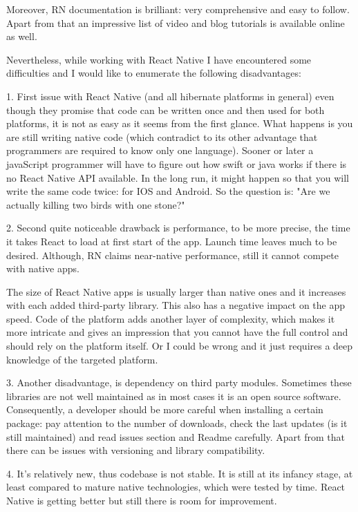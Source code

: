 Moreover, RN documentation is brilliant: very comprehensive and easy to follow.
Apart from that an impressive list of video and blog tutorials is available online as well.

Nevertheless, while working with React Native I have encountered some difficulties and I would like to enumerate the following disadvantages:

1. First issue with React Native (and all hibernate platforms in general) even though they promise that code can be written once and then used for both platforms, it is not as easy as it seems from the first glance. What happens is you are still writing native code (which contradict to its other advantage that programmers are required to know only one language). Sooner or later a javaScript programmer will have to figure out how swift or java works if there is no React Native API available. In the long run, it might happen so that you will write the same code twice: for IOS and Android. So the question is: "Are we actually killing two birds with one stone?"

2. Second quite noticeable drawback is performance, to be more precise, the time it takes React to load at first start of the app. Launch time leaves much to be desired.
Although, RN claims near-native performance, still it cannot compete with native apps.

The size of React Native apps is usually larger than native ones and it increases with each added third-party library. This also has a negative impact on the app speed.
Code of the platform adds another layer of complexity, which makes it more intricate and gives an impression that you cannot have the full control and should rely on the platform itself.
Or I could be wrong and it just requires a deep knowledge of the targeted platform.

3. Another disadvantage, is dependency on third party modules.
Sometimes these libraries are not well maintained as in most cases it is an open source software. Consequently, a developer should be more careful when installing a certain package: pay attention to the number of downloads, check the last updates (is it still maintained) and read issues section and Readme carefully. 
Apart from that there can be issues with versioning and library compatibility. 

4. It’s relatively new, thus codebase is not stable. It is still at its infancy stage, at least compared to mature native technologies, which were tested by time. React Native is getting better but still there is room for improvement.

